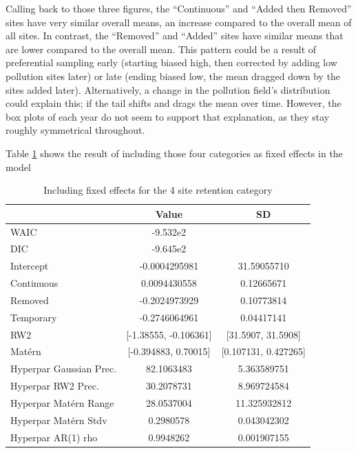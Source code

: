 \documentclass{article}
\begin{document}
Calling back to those three figures, the ``Continuous'' and ``Added then Removed'' sites have very similar overall means, an increase compared to the overall mean of all sites.  In contrast, the ``Removed'' and ``Added'' sites have similar means that are lower compared to the overall mean.
This pattern could be a result of preferential sampling early (starting biased high, then corrected by adding low pollution sites later) or late (ending biased low, the mean dragged down by the sites added later). Alternatively, a change in the pollution field's distribution could explain this; if the tail shifts and drags the mean over time.  However, the box plots of each year do not seem to support that explanation,
as they stay roughly symmetrical throughout.

Table \ref{tab:model_INLA_4site_Retention} shows the result of including those four categories as fixed effects in the model

\begin{table}[ht]
	\centering
	\begin{tabular}{l|c|c}
		& Value & SD  \\
		\hline
		WAIC & -9.532e2 & \\
		DIC & -9.645e2 & \\
		Intercept & -0.0004295981  & 31.59055710 \\
		Continuous & 0.0094430558  & 0.12665671   \\
		Removed & -0.2024973929   & 0.10773814   \\
		Temporary & -0.2746064961   & 0.04417141\\
		RW2 & [-1.38555, -0.106361] & [31.5907, 31.5908] \\
		Mat\'{e}rn & [-0.394883, 0.70015] & [0.107131, 0.427265] \\
		Hyperpar Gaussian Prec. & 82.1063483 & 5.363589751  \\
		Hyperpar RW2 Prec. & 30.2078731   &  8.969724584 \\
		Hyperpar Mat\'{e}rn Range & 28.0537004  & 11.325932812  \\
		Hyperpar Mat\'{e}rn Stdv & 0.2980578  & 0.043042302   \\
		Hyperpar AR(1) rho & 0.9948262   & 0.001907155  
	\end{tabular}
	\caption{Including fixed effects for the 4 site retention category }
	\label{tab:model_INLA_4site_Retention}
\end{table}

\end{document}

